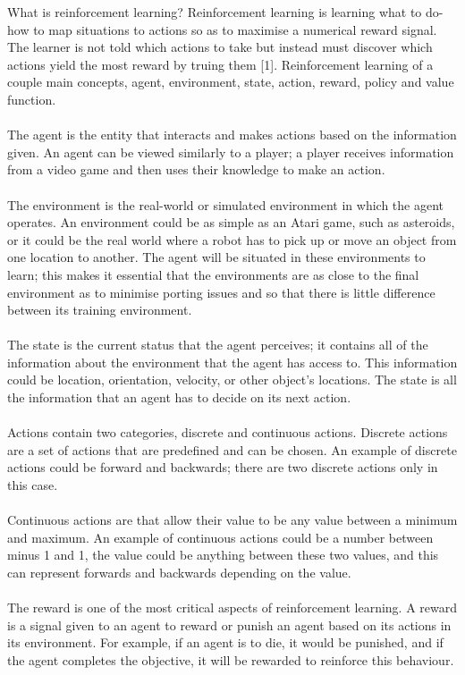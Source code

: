 \documentclass[a4paper,11pt]{article}
\begin{document}
What is reinforcement learning? Reinforcement learning is learning what to do-how to map situations to actions so as to maximise a numerical reward signal. The learner is not told which actions to take but instead must discover which actions yield the most reward by truing them [1]. Reinforcement learning of a couple main concepts, agent, environment, state, action, reward, policy and value function.
\\\\
The agent is the entity that interacts and makes actions based on the information given. An agent can be viewed similarly to a player; a player receives information from a video game and then uses their knowledge to make an action.
\\\\
The environment is the real-world or simulated environment in which the agent operates. An environment could be as simple as an Atari game, such as asteroids, or it could be the real world where a robot has to pick up or move an object from one location to another. The agent will be situated in these environments to learn; this makes it essential that the environments are as close to the final environment as to minimise porting issues and so that there is little difference between its training environment.
\\\\
The state is the current status that the agent perceives; it contains all of the information about the environment that the agent has access to. This information could be location, orientation, velocity, or other object's locations. The state is all the information that an agent has to decide on its next action.
\\\\
Actions contain two categories, discrete and continuous actions. Discrete actions are a set of actions that are predefined and can be chosen. An example of discrete actions could be forward and backwards; there are two discrete actions only in this case.
\\\\
Continuous actions are that allow their value to be any value between a minimum and maximum. An example of continuous actions could be a number between minus 1 and 1, the value could be anything between these two values, and this can represent forwards and backwards depending on the value.
\\\\
The reward is one of the most critical aspects of reinforcement learning. A reward is a signal given to an agent to reward or punish an agent based on its actions in its environment. For example, if an agent is to die, it would be punished, and if the agent completes the objective, it will be rewarded to reinforce this behaviour.
\end{document}
